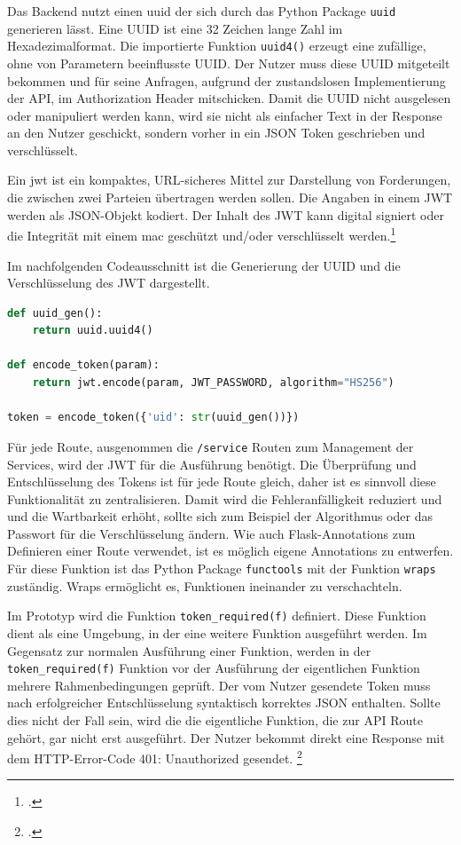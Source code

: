 Das Backend nutzt einen \ac{uuid} der sich durch das Python Package \texttt{uuid} generieren lässt. Eine UUID ist eine 32 Zeichen lange Zahl im Hexadezimalformat. Die importierte Funktion \texttt{uuid4()} erzeugt eine zufällige, ohne von Parametern beeinflusste UUID. Der Nutzer muss diese UUID mitgeteilt bekommen und für seine Anfragen, aufgrund der zustandslosen Implementierung der API, im Authorization Header mitschicken. Damit die UUID nicht ausgelesen oder manipuliert werden kann, wird sie nicht als einfacher Text in der Response an den Nutzer geschickt, sondern vorher in ein JSON Token geschrieben und verschlüsselt.

Ein \ac{jwt} ist ein kompaktes, URL-sicheres Mittel zur Darstellung von Forderungen, die zwischen zwei Parteien übertragen werden sollen. Die Angaben in einem JWT werden als JSON-Objekt kodiert. Der Inhalt des JWT kann digital signiert oder die Integrität mit einem \ac{mac} geschützt und/oder verschlüsselt werden.\footcite{jones2015json}

Im nachfolgenden Codeausschnitt ist die Generierung der UUID und die Verschlüsselung des JWT dargestellt.
\begin{lstlisting}[language=Python, caption={Generierung der UUID und Erstellung des JWT}]
def uuid_gen():
    return uuid.uuid4()
    
def encode_token(param):
    return jwt.encode(param, JWT_PASSWORD, algorithm="HS256")

token = encode_token({'uid': str(uuid_gen())})
\end{lstlisting}

Für jede Route, ausgenommen die \texttt{/service} Routen zum Management der Services, wird der JWT für die Ausführung benötigt. Die Überprüfung und Entschlüsselung des Tokens ist für jede Route gleich, daher ist es sinnvoll diese Funktionalität zu zentralisieren. Damit wird die Fehleranfälligkeit reduziert und und die Wartbarkeit erhöht, sollte sich zum Beispiel der Algorithmus oder das Passwort für die Verschlüsselung ändern. Wie auch Flask-Annotations zum Definieren einer Route verwendet, ist es möglich eigene Annotations zu entwerfen. Für diese Funktion ist das Python Package \texttt{functools} mit der Funktion \texttt{wraps} zuständig. Wraps ermöglicht es, Funktionen ineinander zu verschachteln.

Im Prototyp wird die Funktion \texttt{token\_{}required(f)} definiert. Diese Funktion dient als eine Umgebung, in der eine weitere Funktion ausgeführt werden. Im Gegensatz zur normalen Ausführung einer Funktion, werden in der \texttt{token\_{}required(f)} Funktion vor der Ausführung der eigentlichen Funktion mehrere Rahmenbedingungen geprüft. Der vom Nutzer gesendete Token muss nach erfolgreicher Entschlüsselung syntaktisch korrektes JSON enthalten. Sollte dies nicht der Fall sein, wird die die eigentliche Funktion, die zur API Route gehört, gar nicht erst ausgeführt. Der Nutzer bekommt direkt eine Response mit dem HTTP-Error-Code 401: Unauthorized gesendet. \footcite{fielding1999rfc2616}


